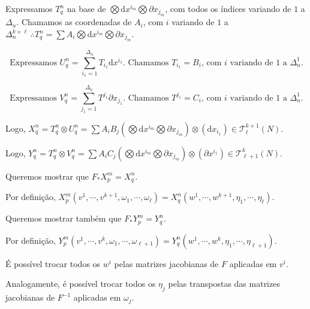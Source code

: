 \documentclass[12pt]{article}
\begin{document}
		\vspace{3mm}

		Expressamos $T_q^n$ na base de $\bigotimes \mathrm{d}x^{i_m} \bigotimes \partial x_{j_m}$, com todos os \'indices variando de $1$ a $\Delta_n$. Chamamos as coordenadas de $A_i$, com $i$ variando de $1$ a $\Delta_n^{k + \ell}\,\therefore T_q^n = \sum A_i \bigotimes \mathrm{d}x^{i_m} \bigotimes \partial x_{j_m}$.

\begin{equation*}
		\text{Expressamos }U_q^n = \sum_{i_1 = 1}^{\Delta_n} T_{i_1} \mathrm{d}x^{i_1}\text{. Chamamos }T_{i_1} = B_i\text{, com }i\text{ variando de }1\text{ a }\Delta_n^1.
\end{equation*}

\begin{equation*}
		\text{Expressamos }V_q^n = \sum_{j_1 = 1}^{\Delta_n} T^{j_1} \partial x_{j_1}\text{. Chamamos }T^{j_1} = C_i\text{, com }i\text{ variando de }1\text{ a }\Delta_n^1.
\end{equation*}

		Logo, $X_q^n = T_q^n \otimes U_q^n = \sum A_i B_j (\bigotimes \mathrm{d}x^{i_m} \bigotimes \partial x_{j_m}) \otimes (\mathrm{d}x_{i_1}) \in \mathcal{T}^{k+1}_\ell(N)$.

		\vspace{3mm}

		Logo, $Y_q^n = T_q^n \otimes V_q^n = \sum A_i C_j (\bigotimes \mathrm{d}x^{i_m} \bigotimes \partial x_{j_m}) \otimes (\partial x^{i_1}) \in \mathcal{T}^k_{\ell+1}(N)$.

		\vspace{3mm}

		Queremos mostrar que $F_* X_p^m = X_q^n$.

		Por defini\c{c}\~ao, $X^m_p (v^1, \cdots, v^{k + 1}, \omega_1, \cdots, \omega_\ell) = X_q^n (w^1, \cdots, w^{k + 1}, \eta_1, \cdots, \eta_\ell)$.

		\vspace{3mm}

		Queremos mostrar tamb\'em que $F_* Y_p^m = Y_q^n$.

		Por defini\c{c}\~ao, $Y^m_p (v^1, \cdots, v^k, \omega_1, \cdots, \omega_{\ell + 1}) = Y_q^n (w^1, \cdots, w^k, \eta_1, \cdots, \eta_{\ell + 1})$.

		\vspace{3mm}

		\'E poss\'ivel trocar todos os $w^i$ pelas matrizes jacobianas de $F$ aplicadas em $v^i$.

		Analogamente, \'e poss\'ivel trocar todos os $\eta_j$ pelas transpostas das matrizes jacobianas de $F^{-1}$ aplicadas em $\omega_j$.
\end{document}
